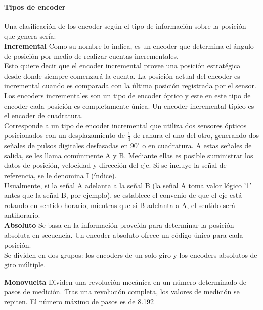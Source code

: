 \documentclass[12pt,titlepage]{article}
\begin{document}
\paragraph{Tipos de encoder}\leavevmode\newline
Una clasificación de los encoder según el tipo de información sobre la posición que genera sería: \\[0.8mm]

\textbf{Incremental}
Como su nombre lo indica, es un encoder que determina el ángulo de posición por medio de realizar cuentas incrementales. \\
Esto quiere decir que el encoder incremental provee una posición estratégica desde donde siempre comenzará la cuenta. La posición actual del encoder es incremental cuando es comparada con la última posición registrada por el sensor. \\

Los encoders incrementales son un tipo de encoder óptico y este en este tipo de encoder cada posición es completamente única. 
Un encoder incremental típico es el encoder de cuadratura. \\[0.8mm]


Corresponde a un tipo de encoder incremental que utiliza dos sensores ópticos posicionados con un desplazamiento de $\frac{1}{4}$ de ranura el uno del otro, generando dos señales de pulsos digitales desfasadas en $90^{\circ}$ o en cuadratura. A estas señales de salida, se les llama comúnmente A y B. Mediante ellas es posible suministrar los datos de posición, velocidad y dirección del eje. Si se incluye la señal de referencia, se le denomina I (índice). \\[0.8mm]

Usualmente, si la señal A adelanta a la señal B (la señal A toma valor lógico '1' antes que la señal B, por ejemplo), se establece el convenio de que el eje está rotando en sentido horario, mientras que si B adelanta a A, el sentido será antihorario.\\

\textbf{Absoluto}
Se basa en la información proveída para determinar la posición absoluta en secuencia. Un encoder absoluto ofrece un código único para cada posición. \\

Se dividen en dos grupos: los encoders de un solo giro y los encoders absolutos de giro múltiple. \\
\newpage

\textbf{Monovuelta}
Dividen una revolución mecánica en un número determinado de pasos de medición. Tras una revolución completa, los valores de medición se repiten. El número máximo de pasos es de 8.192 \\[0.8mm] 
\end{document}
